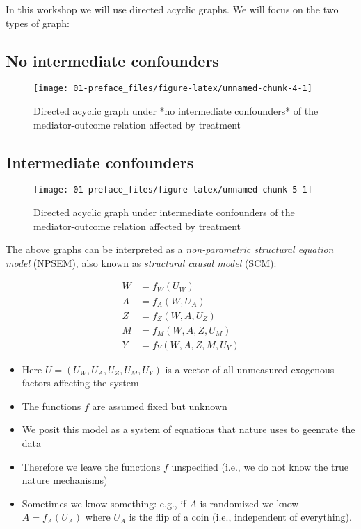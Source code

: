 \documentclass[
  12pt,
]{book}
\providecommand{\tightlist}{%
  \setlength{\itemsep}{0pt}\setlength{\parskip}{0pt}}
\theoremstyle{definition}
\theoremstyle{definition}
\theoremstyle{definition}
\newcommand{\1}{\mathbbm{1}}
\begin{document}
In this workshop we will use directed acyclic graphs. We will focus on the two
types of graph:

\hypertarget{no-intermediate-confounders}{%
\subsection{No intermediate confounders}\label{no-intermediate-confounders}}

\begin{figure}

{\centering \texttt{[image: 01-preface\_files/figure-latex/unnamed-chunk-4-1]} 

}

\caption{Directed acyclic graph under *no intermediate confounders* of the mediator-outcome relation affected by treatment}\label{fig:unnamed-chunk-4}
\end{figure}

\hypertarget{intermediate-confounders}{%
\subsection{Intermediate confounders}\label{intermediate-confounders}}

\begin{figure}

{\centering \texttt{[image: 01-preface\_files/figure-latex/unnamed-chunk-5-1]} 

}

\caption{Directed acyclic graph under intermediate confounders of the mediator-outcome relation affected by treatment}\label{fig:unnamed-chunk-5}
\end{figure}

The above graphs can be interpreted as a \emph{non-parametric structural equation model}
(NPSEM), also known as \emph{structural causal model} (SCM):

\begin{align}
  W & = f_W(U_W)\\
  A & = f_A(W, U_A)\\
  Z & = f_Z(W, A, U_Z)\\
  M & = f_M(W, A, Z, U_M)\\
  Y & = f_Y(W, A, Z, M, U_Y)
\end{align}

\begin{itemize}
\tightlist
\item
  Here \(U=(U_W, U_A, U_Z, U_M, U_Y)\) is a vector of all unmeasured exogenous
  factors affecting the system
\item
  The functions \(f\) are assumed fixed but unknown
\item
  We posit this model as a system of equations that nature uses to geenrate the
  data
\item
  Therefore we leave the functions \(f\) unspecified (i.e., we do not know the
  true nature mechanisms)
\item
  Sometimes we know something: e.g., if \(A\) is randomized we know \(A=f_A(U_A)\)
  where \(U_A\) is the flip of a coin (i.e., independent of everything).
\end{itemize}
\end{document}
